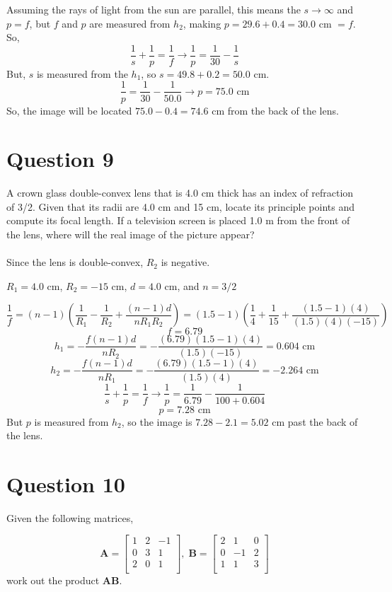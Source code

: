 \documentclass[a4paper]{article}
\begin{document}
Assuming the rays of light from the sun are parallel, this means the $s \rightarrow \infty$ and $p=f$, but $f$ and $p$ are measured from $h_2$, making
$p = 29.6 + 0.4 = 30.0$ cm $=f$. So,
$$ \frac{1}{s} + \frac{1}{p} = \frac{1}{f} \rightarrow \frac{1}{p} = \frac{1}{30} - \frac{1}{s}$$
But, $s$ is measured from the $h_1$, so $s = 49.8 + 0.2 = 50.0$ cm.
$$ \frac{1}{p} = \frac{1}{30} - \frac{1}{50.0} \rightarrow p=75.0 \textrm{ cm}$$
So, the image will be located $75.0 - 0.4=74.6$ cm from the back of the lens.

\section*{Question 9}
A crown glass double-convex lens that is 4.0 cm thick has an index of refraction of 3/2. Given that
its radii are 4.0 cm and 15 cm, locate its principle points and compute its focal length. If a television
screen is placed 1.0 m from the front of the lens, where will the real image of the picture appear?\\\\

Since the lens is double-convex, $R_2$ is negative.
\begin{center}
    $R_1 = 4.0$ cm, $R_2 = -15$ cm, $d = 4.0$ cm, and $n = 3/2$
\end{center}
$$ \frac{1}{f} = (n - 1) \left(\frac{1}{R_1} - \frac{1}{R_2} + \frac{(n-1)d}{nR_1 R_2}\right) = (1.5 - 1) \left(\frac{1}{4} + \frac{1}{15} + \frac{(1.5-1)(4)}{(1.5)(4)(-15)}\right)$$
$$ f = 6.79 $$
$$ h_1 = - \frac{f(n-1)d}{nR_2} = - \frac{(6.79)(1.5-1)(4)}{(1.5)(-15)} = 0.604 \textrm{ cm}$$
$$ h_2 = - \frac{f(n-1)d}{nR_1} = - \frac{(6.79)(1.5-1)(4)}{(1.5)(4)} = -2.264 \textrm{ cm}$$
$$ \frac{1}{s} + \frac{1}{p} = \frac{1}{f} \rightarrow \frac{1}{p} = \frac{1}{6.79} - \frac{1}{100 + 0.604}$$
$$ p = 7.28 \textrm{ cm}$$
But $p$ is measured from $h_2$, so the image is $7.28 - 2.1 = 5.02$ cm past the back of the lens.

\section*{Question 10}
Given the following matrices,

$$ 
\bm{A} = \begin{bmatrix}
    1 & 2 & -1 \\
    0 & 3 & 1 \\
    2 & 0 & 1 \\
\end{bmatrix},\;
\bm{B} = \begin{bmatrix}
    2 & 1 & 0 \\
    0 & -1 & 2 \\
    1 & 1 & 3 \\
\end{bmatrix} $$
work out the product $\bm{A}\bm{B}$.\\\\
\end{document}
